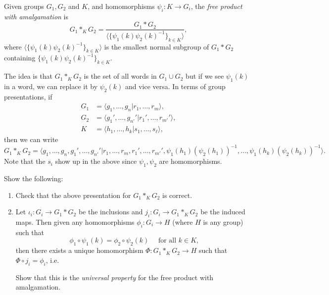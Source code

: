 \begin{definition}
  Given groups $G_1, G_2$ and $K$, and homomorphisms
  $\psi_i : K \to G_i$, the \emph{free product with amalgamation}
  is
  \[
  G_1 *_K G_2 = \frac{G_1 * G_2}{\langle \{\psi_1(k) \psi_2(k)^{-1}\}_{k \in K} \rangle},
  \]
  where $\langle \{\psi_1(k) \psi_2(k)^{-1}\}_{k \in K} \rangle$ is the
  smallest normal subgroup of $G_1 * G_2$ containing
  $\{\psi_1(k) \psi_2(k)^{-1}\}_{k \in K}$.
\end{definition}

\begin{remark}
  The idea is that $G_1 *_K G_2$ is the set of all
  words in $G_1 \cup G_2$ but if we see
  $\psi_1(k)$ in a word, we can replace it
  by $\psi_2(k)$ and vice versa. In terms of
  group presentations, if
  \begin{align*}
    G_1 &= \langle g_1, \dots, g_n | r_1, \dots, r_m \rangle, \\
    G_2 &= \langle g_1', \dots, g_{n'}' | r_{1}', \dots, r_{m'}' \rangle, \\
    K &= \langle h_1, \dots, h_k | s_1, \dots, s_\ell \rangle,
  \end{align*}
  then we can write
  \[
    G_1 *_K G_2 = \langle g_1, \dots, g_n, g_1', \dots, g_{n'}' | r_1, \dots, r_m, r_{1}', \dots, r_{m'}', \psi_1(h_1) (\psi_2(h_1))^{-1}, \dots, \psi_1(h_k)(\psi_2(h_k))^{-1} \rangle.
  \]
  Note that the $s_i$ show up in the above since
  $\psi_1, \psi_2$ are homomorphisms.
\end{remark}

\begin{exercise}
  Show the following:
  \begin{enumerate}
    \item Check that the above presentation for
      $G_1 *_K G_2$ is correct.
    \item Let $\iota_i : G_i \to G_1 * G_2$ be the inclusions
      and $j_i : G_i \to G_1 *_K G_2$
      be the induced maps. Then given any homomorphisms
      $\phi_i : G_i \to H$ (where $H$ is any group)
      such that
      \[
        \phi_1 \circ \psi_1(k) = \phi_2 \circ \psi_2(k)
        \quad \text{ for all } k \in K,
      \]
      then there exists a unique homomorphism
      $\Phi : G_1 *_K G_2 \to H$ such that
      $\Phi \circ j_i = \phi_i$, i.e.
      \begin{center}
      \end{center}
      Show that this
      is the \emph{universal property} for the
      free product with amalgamation.
  \end{enumerate}
\end{exercise}

